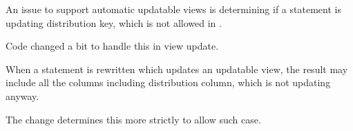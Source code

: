 %
%

  An issue to support automatic updatable views is determining if a statement is
  updating distribution key, which is not allowed in \XC.
  
  Code changed a bit to handle this in view update.
  
  When a statement is rewritten which updates an updatable view, the result may
  include all the columns including distribution column, which is not updating anyway.
  
  The change determines this more strictly to allow such case.
